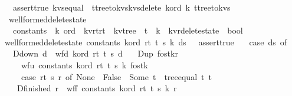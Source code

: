 \begin{isabellebody}
\ \ assert{\isacharunderscore}true\ {\isacharparenleft}kvs{\isacharunderscore}equal\ {\isacharparenleft}\ {\isacharparenleft}t{}{\isacharbar}{\isachargreater}tree{\isacharunderscore}to{\isacharunderscore}kvs{\isacharbar}{\isachargreater}kvs{\isacharunderscore}delete\ k{\isacharunderscore}ord\ k{\isacharparenright}{\isacharparenright}\ {\isacharparenleft}t{\isacharprime}{\isacharbar}{\isachargreater}tree{\isacharunderscore}to{\isacharunderscore}kvs{\isacharparenright}{\isacharparenright}{\isacharparenright}{\isachardoublequoteclose}\isanewline
\isanewline
{}\isamarkupfalse%
\ wellformed{\isacharunderscore}delete{\isacharunderscore}state\ {\isacharcolon}{\isacharcolon}\ \isanewline
\ \ {\isachardoublequoteopen}constants\ {\isasymRightarrow}\ {\isacharprime}k\ ord\ {\isasymRightarrow}\ {\isacharparenleft}{\isacharprime}k{\isacharcomma}{\isacharprime}v{\isacharcomma}{\isacharprime}r{\isacharcomma}{\isacharprime}t{\isacharparenright}r{}t\ {\isasymRightarrow}\ {\isacharparenleft}{\isacharprime}k{\isacharcomma}{\isacharprime}v{\isacharparenright}tree\ {\isasymRightarrow}\ {\isacharprime}t\ {\isasymRightarrow}\ {\isacharprime}k\ {\isasymRightarrow}\ {\isacharparenleft}{\isacharprime}k{\isacharcomma}{\isacharprime}v{\isacharcomma}{\isacharprime}r{\isacharparenright}delete{\isacharunderscore}state\ {\isasymRightarrow}\ bool{\isachardoublequoteclose}\ \isanewline
{}\isanewline
{\isachardoublequoteopen}wellformed{\isacharunderscore}delete{\isacharunderscore}state\ constants\ k{\isacharunderscore}ord\ r{}t\ t{}\ s\ k\ ds\ {\isacharequal}\ \ assert{\isacharunderscore}true\ {\isacharparenleft}\isanewline
\ \ case\ ds\ of\ \isanewline
\ \ D{\isacharunderscore}down\ d\ {\isasymRightarrow}\ {\isacharparenleft}wf{\isacharunderscore}d\ k{\isacharunderscore}ord\ r{}t\ t{}\ s\ d{\isacharparenright}\isanewline
\ \ {\isacharbar}\ D{\isacharunderscore}up\ {\isacharparenleft}fo{\isacharcomma}stk{\isacharcomma}r{\isacharparenright}\ {\isasymRightarrow}\ {\isacharparenleft}\isanewline
\ \ \ \ wf{\isacharunderscore}u\ constants\ k{\isacharunderscore}ord\ r{}t\ t{}\ s\ k\ {\isacharparenleft}fo{\isacharcomma}stk{\isacharparenright}\ {\isacharampersand}\ \isanewline
\ \ \ \ {\isacharparenleft}case\ r{}t\ s\ r\ of\ None\ {\isasymRightarrow}\ False\ {\isacharbar}\ Some\ t\ {\isasymRightarrow}\ tree{\isacharunderscore}equal\ t\ t{}{\isacharparenright}{\isacharparenright}\isanewline
\ \ {\isacharbar}\ D{\isacharunderscore}finished\ r\ {\isasymRightarrow}\ {\isacharparenleft}wf{\isacharunderscore}f\ constants\ k{\isacharunderscore}ord\ r{}t\ t{}\ s\ k\ r{\isacharparenright}\ {\isacharparenright}{\isachardoublequoteclose}\isanewline
\isanewline
\isanewline
%
\isadelimtheory
\isanewline
%
\endisadelimtheory
%
\isatagtheory
{}\isamarkupfalse%
%
\endisatagtheory
{\isafoldtheory}%
%
\isadelimtheory
%
\endisadelimtheory
\end{isabellebody}%
